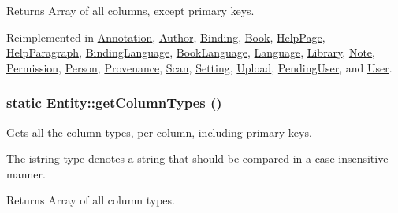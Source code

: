 \begin{DoxyReturn}{Returns}
Array of all columns, except primary keys. 
\end{DoxyReturn}


Reimplemented in \hyperlink{classAnnotation_a9e9b41c456e409ae6223258c4ba1fb94}{Annotation}, \hyperlink{classAuthor_aa3e40fdf422c171a8e307725ca5ff05c}{Author}, \hyperlink{classBinding_a4caf9958cba0f34b8b08aae313afc9ec}{Binding}, \hyperlink{classBook_a26e48647691c869f9de967b1e5e2e49d}{Book}, \hyperlink{classHelpPage_a56d2e02b9490b1834fadd39fdab3e312}{HelpPage}, \hyperlink{classHelpParagraph_ae136cb09440d889fe1dc2d552a4995ae}{HelpParagraph}, \hyperlink{classBindingLanguage_a98dcffedcdfc0ebe0701353fd2d17d06}{BindingLanguage}, \hyperlink{classBookLanguage_afc7dd0ea15ff9f1e04006c4ccc0c8bb6}{BookLanguage}, \hyperlink{classLanguage_aca9b17402d92635b3092d255ca90e551}{Language}, \hyperlink{classLibrary_ab67ca6733ca346dccb066c7333ef3426}{Library}, \hyperlink{classNote_ab602c2348fab90e66d061b62c2eb0aac}{Note}, \hyperlink{classPermission_ac2a9a31fc731c58daa3b0b9385ec03fb}{Permission}, \hyperlink{classPerson_aeab90b54dcfecd955b00bd64ceec6eae}{Person}, \hyperlink{classProvenance_a244657b40cc6b72dd868d25a2cafbe57}{Provenance}, \hyperlink{classScan_a51a201a61df50b19fd6a7b96d7521ca5}{Scan}, \hyperlink{classSetting_ac1dc23d6b6f1fbd01ac0fd51e05cab3a}{Setting}, \hyperlink{classUpload_ac1fc86fdee048a39c23f706a5df4e4cc}{Upload}, \hyperlink{classPendingUser_a16417ee5731d54b92514e5af71fc715e}{PendingUser}, and \hyperlink{classUser_a3a4c51317d99ac96fb282cf2ca3c15c9}{User}.

\hypertarget{classEntity_ad69437219c10955803707fbf6ac458e7}{
\subsubsection[{getColumnTypes}]{\setlength{\rightskip}{0pt plus 5cm}static Entity::getColumnTypes ()}}
\label{classEntity_ad69437219c10955803707fbf6ac458e7}
Gets all the column types, per column, including primary keys.

The istring type denotes a string that should be compared in a case insensitive manner.

\begin{DoxyReturn}{Returns}
Array of all column types. 
\end{DoxyReturn}


